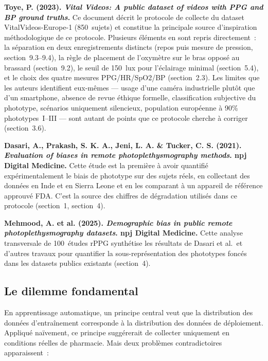 \documentclass[11pt,a4paper]{article}
\begin{document}
\textbf{Toye, P. (2023). \emph{Vital Videos: A public dataset of videos
with PPG and BP ground truths}.} Ce document d\'ecrit le protocole de
collecte du dataset VitalVideos-Europe-1 (850~sujets) et constitue la
principale source d'inspiration m\'ethodologique de ce protocole. Plusieurs
\'el\'ements en sont repris directement~: la s\'eparation en deux
enregistrements distincts (repos puis mesure de pression, section~9.3--9.4),
la r\`egle de placement de l'oxym\`etre sur le bras oppos\'e au brassard
(section~9.2), le seuil de 150~lux pour l'\'eclairage minimal (section~5.4),
et le choix des quatre mesures PPG/HR/SpO2/BP (section~2.3). Les limites que
les auteurs identifient eux-m\^emes --- usage d'une cam\'era industrielle
plut\^ot que d'un smartphone, absence de revue \'ethique formelle,
classification subjective du phototype, sc\'enarios uniquement silencieux,
population europ\'eenne \`a 90\% phototypes~I--III --- sont autant de points
que ce protocole cherche \`a corriger (section~3.6).

\textbf{Dasari, A., Prakash, S. K. A., Jeni, L. A. \& Tucker, C. S. (2021).
\emph{Evaluation of biases in remote photoplethysmography methods}. npj
Digital Medicine.} Cette \'etude est la premi\`ere \`a avoir quantifi\'e
exp\'erimentalement le biais de phototype sur des sujets r\'eels, en
collectant des donn\'ees en Inde et en Sierra Leone et en les comparant \`a
un appareil de r\'ef\'erence approuv\'e FDA. C'est la source des chiffres de
d\'egradation utilis\'es dans ce protocole (section~1, section~4).

\textbf{Mehmood, A. et al. (2025). \emph{Demographic bias in public remote
photoplethysmography datasets}. npj Digital Medicine.} Cette analyse
transversale de 100~\'etudes rPPG synth\'etise les r\'esultats de Dasari et
al.\ et d'autres travaux pour quantifier la sous-repr\'esentation des
phototypes fonc\'es dans les datasets publics existants (section~4).

\subsection{Le dilemme fondamental}

En apprentissage automatique, un principe central veut que la distribution
des donn\'ees d'entra\^inement corresponde \`a la distribution des donn\'ees
de d\'eploiement. Appliqu\'e na\"ivement, ce principe sugg\'ererait de
collecter uniquement en conditions r\'eelles de pharmacie. Mais deux
probl\`emes contradictoires apparaissent~:
\end{document}

